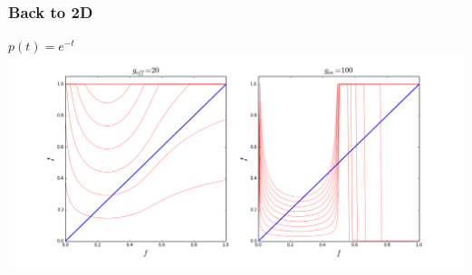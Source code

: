 \documentclass[mathserif]{beamer}
\begin{document}
\begin{frame}
\frametitle{Back to 2D}
$p(t) = e^{-t}$
\includegraphics[width=\textwidth]{2D_MF_expon.png}

\end{frame}
\end{document}

